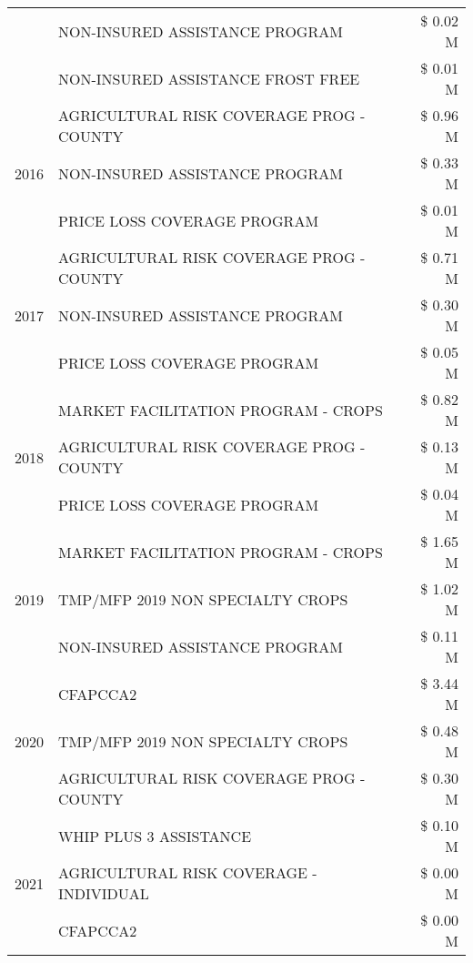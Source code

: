 \begin{tabular}{llr}
 & NON-INSURED ASSISTANCE PROGRAM & \$ 0.02 M \\
 & NON-INSURED ASSISTANCE FROST FREE & \$ 0.01 M \\
\cline{1-3}
\multirow[t]{3}{*}{2016} & AGRICULTURAL RISK COVERAGE PROG - COUNTY & \$ 0.96 M \\
 & NON-INSURED ASSISTANCE PROGRAM & \$ 0.33 M \\
 & PRICE LOSS COVERAGE PROGRAM & \$ 0.01 M \\
\cline{1-3}
\multirow[t]{3}{*}{2017} & AGRICULTURAL RISK COVERAGE PROG - COUNTY & \$ 0.71 M \\
 & NON-INSURED ASSISTANCE PROGRAM & \$ 0.30 M \\
 & PRICE LOSS COVERAGE PROGRAM & \$ 0.05 M \\
\cline{1-3}
\multirow[t]{3}{*}{2018} & MARKET FACILITATION PROGRAM - CROPS & \$ 0.82 M \\
 & AGRICULTURAL RISK COVERAGE PROG - COUNTY & \$ 0.13 M \\
 & PRICE LOSS COVERAGE PROGRAM & \$ 0.04 M \\
\cline{1-3}
\multirow[t]{3}{*}{2019} & MARKET FACILITATION PROGRAM - CROPS & \$ 1.65 M \\
 & TMP/MFP 2019 NON SPECIALTY CROPS & \$ 1.02 M \\
 & NON-INSURED ASSISTANCE PROGRAM & \$ 0.11 M \\
\cline{1-3}
\multirow[t]{3}{*}{2020} & CFAPCCA2 & \$ 3.44 M \\
 & TMP/MFP 2019 NON SPECIALTY CROPS & \$ 0.48 M \\
 & AGRICULTURAL RISK COVERAGE PROG - COUNTY & \$ 0.30 M \\
\cline{1-3}
\multirow[t]{3}{*}{2021} & WHIP PLUS 3 ASSISTANCE & \$ 0.10 M \\
 & AGRICULTURAL RISK COVERAGE - INDIVIDUAL & \$ 0.00 M \\
 & CFAPCCA2 & \$ 0.00 M \\
\cline{1-3}
\bottomrule
\end{tabular}
